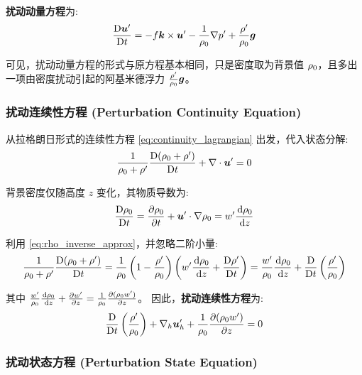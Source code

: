 \textbf{扰动动量方程}为:
\begin{equation}
    \frac{\mathrm{D} \bm{u}^\prime}{\mathrm{D} t} = -f \bm{k} \times \bm{u}^\prime - \frac{1}{\rho_0} \nabla p^\prime + \frac{\rho^\prime}{\rho_0} \bm{g}
    \label{eq:perturbation_momentum}
\end{equation}

可见，扰动动量方程的形式与原方程基本相同，只是密度取为背景值 $\rho_0$，且多出一项由密度扰动引起的阿基米德浮力 $\frac{\rho^\prime}{\rho_0} \bm{g}$。

\subsubsection{扰动连续性方程 (Perturbation Continuity Equation)}

从拉格朗日形式的连续性方程 \eqref{eq:continuity_lagrangian} 出发，代入状态分解:
\begin{equation*}
    \frac{1}{\rho_0 + \rho^\prime} \frac{\mathrm{D} (\rho_0 + \rho^\prime)}{\mathrm{D} t} + \nabla \cdot \bm{u}^\prime = 0
\end{equation*}

背景密度仅随高度 $z$ 变化，其物质导数为:
\begin{equation*}
    \matderiv{\density_0} = \pde{\density_0}{\timevar} + \vel^\prime \cdot \nabla \density_0 = w^\prime \ode{\density_0}{z}
\end{equation*}

利用 \eqref{eq:rho_inverse_approx}，并忽略二阶小量:
\begin{equation*}
    \frac{1}{\density_0 + \density^\prime} \matderiv{(\density_0 + \density^\prime)} = \frac{1}{\density_0} \left(1 - \frac{\density^\prime}{\density_0}\right) \left(w^\prime \ode{\density_0}{z} + \matderiv{\density^\prime}\right) = \frac{w^\prime}{\density_0} \ode{\density_0}{z} + \matderiv{}\left(\frac{\density^\prime}{\density_0}\right)
\end{equation*}

其中 $\frac{w^\prime}{\density_0} \ode{\density_0}{z} + \pde{w^\prime}{z} = \frac{1}{\density_0} \pde{(\density_0 w^\prime)}{z}$。
因此，\textbf{扰动连续性方程}为:
\begin{equation}
    \matderiv{}\left(\frac{\density^\prime}{\density_0}\right) + \nabla_h \vel_h^\prime + \frac{1}{\density_0} \pde{(\density_0 w^\prime)}{z} = 0
    \label{eq:perturbation_continuity}
\end{equation}

\subsubsection{扰动状态方程 (Perturbation State Equation)}


